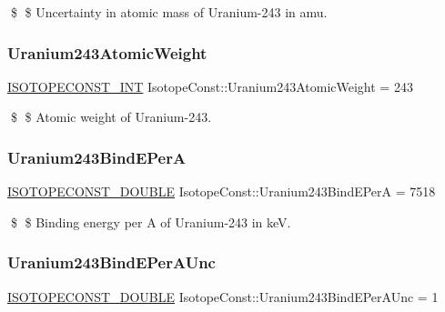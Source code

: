 \$ \$ Uncertainty in atomic mass of Uranium-\/243 in amu. \mbox{\label{group___isotope_const-_uranium-_u243_ga1a9b29d530f9efa3ee8f5e9417c34af3}} 
\subsubsection{\texorpdfstring{Uranium243\+Atomic\+Weight}{Uranium243AtomicWeight}}
{\footnotesize\ttfamily \mbox{\hyperlink{group___isotope_const-_macros_ga5f18360b3e99483a35c32d789e62621c}{I\+S\+O\+T\+O\+P\+E\+C\+O\+N\+S\+T\+\_\+\+I\+NT}} Isotope\+Const\+::\+Uranium243\+Atomic\+Weight = 243}

\$ \$ Atomic weight of Uranium-\/243. \mbox{\label{group___isotope_const-_uranium-_u243_ga48de8d4bc261eb4cb695a55029c4ad02}} 
\subsubsection{\texorpdfstring{Uranium243\+Bind\+E\+PerA}{Uranium243BindEPerA}}
{\footnotesize\ttfamily \mbox{\hyperlink{group___isotope_const-_macros_ga8f45a7272ce02c0b4c65c44636ed719a}{I\+S\+O\+T\+O\+P\+E\+C\+O\+N\+S\+T\+\_\+\+D\+O\+U\+B\+LE}} Isotope\+Const\+::\+Uranium243\+Bind\+E\+PerA = 7518}

\$ \$ Binding energy per A of Uranium-\/243 in keV. \mbox{\label{group___isotope_const-_uranium-_u243_gaa22741e92fe9ae4bc58a0b861e174d03}} 
\subsubsection{\texorpdfstring{Uranium243\+Bind\+E\+Per\+A\+Unc}{Uranium243BindEPerAUnc}}
{\footnotesize\ttfamily \mbox{\hyperlink{group___isotope_const-_macros_ga8f45a7272ce02c0b4c65c44636ed719a}{I\+S\+O\+T\+O\+P\+E\+C\+O\+N\+S\+T\+\_\+\+D\+O\+U\+B\+LE}} Isotope\+Const\+::\+Uranium243\+Bind\+E\+Per\+A\+Unc = 1}

